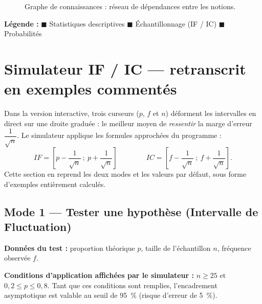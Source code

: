 \documentclass[11pt,a4paper]{article}
\newcommand{\IF}{\textit{IF}}
\newcommand{\IC}{\textit{IC}}
\begin{document}
\begin{figure}[htbp]
{%
		}%
		\caption{Graphe de connaissances : réseau de dépendances entre les notions.}
		\label{fig:graphe}
	\end{figure}
	
	\noindent\textbf{Légende :}
	{\color{spBlueDark}$\blacksquare$} Statistiques descriptives \quad
	{\color{spGreenDark}$\blacksquare$} Échantillonnage (IF / IC) \quad
	{\color{spPurple}$\blacksquare$} Probabilités
	
	\section{Simulateur IF / IC — retranscrit en exemples commentés}
	
	Dans la version interactive, trois curseurs ($p$, $f$ et $n$) déforment les
	intervalles en direct sur une droite graduée : le meilleur moyen de
	\emph{ressentir} la marge d'erreur $\dfrac{1}{\sqrt{n}}$. Le simulateur applique
	les formules approchées du programme :
	\[
	\IF{} = \left[p - \dfrac{1}{\sqrt{n}}\ ;\ p + \dfrac{1}{\sqrt{n}}\right]
	\qquad\qquad
	\IC{} = \left[f - \dfrac{1}{\sqrt{n}}\ ;\ f + \dfrac{1}{\sqrt{n}}\right].
	\]
	Cette section en reprend les deux modes et les valeurs par défaut, sous forme
	d'exemples entièrement calculés.
	
	\subsection{Mode 1 — Tester une hypothèse (Intervalle de Fluctuation)}
	
	\textbf{Données du test :} proportion théorique $p$, taille de l'échantillon
	$n$, fréquence observée $f$.
	
	\begin{notebox}
		\textbf{Conditions d'application affichées par le simulateur :}
		$n \geq 25$ \quad et \quad $0{,}2 \leq p \leq 0{,}8$.
		Tant que ces conditions sont remplies, l'encadrement asymptotique est valable
		au seuil de 95~\% (risque d'erreur de 5~\%).
	\end{notebox}
	
\end{document}
